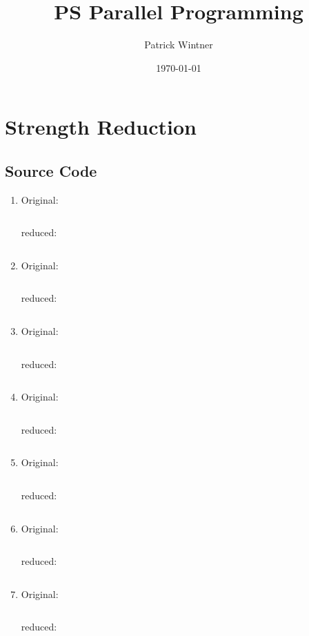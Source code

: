 \documentclass[parskip]{scrartcl}
\title{PS Parallel Programming}
\author{Patrick Wintner}
\date{\today}
\begin{document}
	\maketitle
	
	\section{Strength Reduction}
	\subsection{Source Code}
	\begin{enumerate}[label=\alph*)]
		\item Original: \inputminted[linenos,breaklines]{c}{ex1/a.c}
		
		reduced: \inputminted[linenos,breaklines]{c}{ex1/a_reduced.c}
		
		\item Original: \inputminted[linenos,breaklines]{c}{ex1/b.c}
		reduced: \inputminted[linenos,breaklines]{c}{ex1/b_reduced.c}
		
		\item Original: \inputminted[linenos,breaklines]{c}{ex1/c.c}
		reduced: \inputminted[linenos,breaklines]{c}{ex1/c_reduced.c}
		
		\item Original: \inputminted[linenos,breaklines]{c}{ex1/d.c}
		reduced: \inputminted[linenos,breaklines]{c}{ex1/d_reduced.c}
		
		\item Original: \inputminted[linenos,breaklines]{c}{ex1/e.c}
		reduced: \inputminted[linenos,breaklines]{c}{ex1/e_reduced.c}
		
		\item Original: \inputminted[linenos,breaklines]{c}{ex1/f.c}
		reduced: \inputminted[linenos,breaklines]{c}{ex1/f_reduced.c}
		
		\item Original: \inputminted[linenos,breaklines]{c}{ex1/g.c}
		reduced: \inputminted[linenos,breaklines]{c}{ex1/g_reduced.c}
	\end{enumerate}
	
\end{document}

